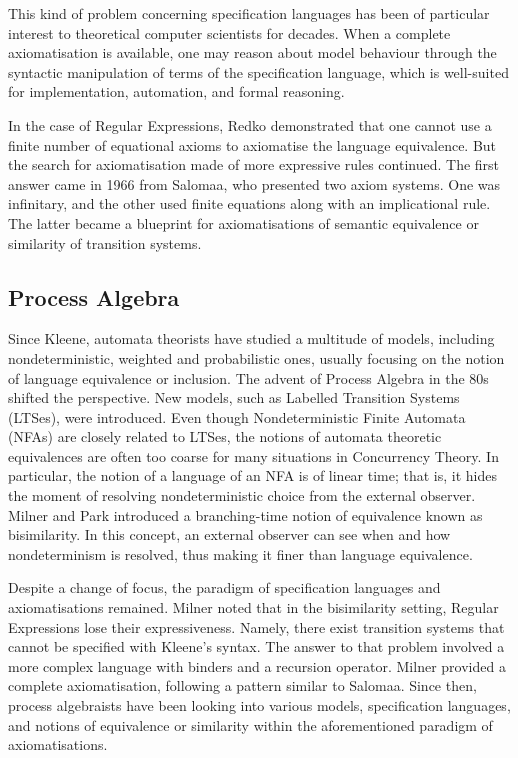 This kind of problem concerning specification languages has been of particular interest to theoretical computer scientists for decades. When a complete axiomatisation is available, one may reason about model behaviour through the syntactic manipulation of terms of the specification language, which is well-suited for implementation, automation, and formal reasoning.

In the case of Regular Expressions, Redko demonstrated that one cannot use a finite number of equational axioms to axiomatise the language equivalence. But the search for axiomatisation made of more expressive rules continued. The first answer came in 1966 from Salomaa, who presented two axiom systems. One was infinitary, and the other used finite equations along with an implicational rule. The latter became a blueprint for axiomatisations of semantic equivalence or similarity of transition systems.
\subsection{Process Algebra}
Since Kleene, automata theorists have studied a multitude of models, including nondeterministic, weighted and probabilistic ones, usually focusing on the notion of language equivalence or inclusion. The advent of Process Algebra in the 80s shifted the perspective. New models, such as Labelled Transition Systems (LTSes), were introduced. Even though Nondeterministic Finite Automata (NFAs) are closely related to LTSes, the notions of automata theoretic equivalences are often too coarse for many situations in Concurrency Theory. In particular, the notion of a language of an NFA is of linear time; that is, it hides the moment of resolving nondeterministic choice from the external observer. Milner and Park introduced a branching-time notion of equivalence known as bisimilarity. In this concept, an external observer can see when and how nondeterminism is resolved, thus making it finer than language equivalence. 

Despite a change of focus, the paradigm of specification languages and axiomatisations remained. Milner noted that in the bisimilarity setting, Regular Expressions lose their expressiveness. Namely, there exist transition systems that cannot be specified with Kleene's syntax. The answer to that problem involved a more complex language with binders and a recursion operator. Milner provided a complete axiomatisation, following a pattern similar to Salomaa. Since then, process algebraists have been looking into various models, specification languages, and notions of equivalence or similarity within the aforementioned paradigm of axiomatisations. 

